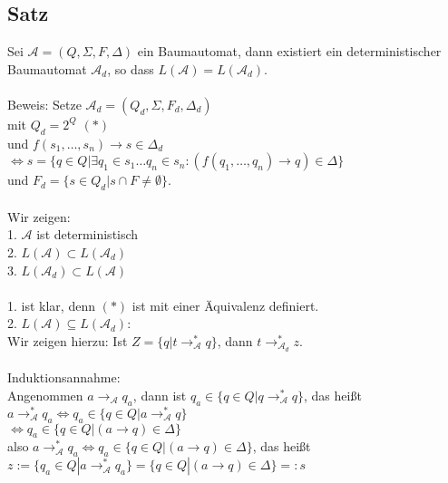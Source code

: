 \documentclass[titlepage]{article}
\begin{document}
\subsection{Satz}

Sei $\mathcal{A} = (Q, \Sigma, F, \Delta)$ ein Baumautomat, dann existiert ein deterministischer Baumautomat $\mathcal{A}_d$, 
so dass $L(\mathcal{A}) = L(\mathcal{A}_d)$.\\ \\

Beweis: Setze $\mathcal{A}_d = (Q_d, \Sigma, F_d, \Delta_d)$ \\
mit $Q_d = 2^Q$ $(\ast)$\\
und $f(s_1, \dots, s_n) \rightarrow s \in \Delta_d$\\
$\Leftrightarrow s = \{ q \in Q | \exists q_1 \in s_1 \dots q_n \in s_n: (f(q_1, \dots, q_n) \rightarrow q) \in \Delta\}$ \\
und $F_d = \{ s \in Q_d | s \cap F \neq \emptyset\}$.\\ \\
Wir zeigen:\\
1. $\mathcal{A}$ ist deterministisch \\
2. $L(\mathcal{A}) \subset L(\mathcal{A}_d)$ \\
3. $L(\mathcal{A}_d) \subset L(\mathcal{A})$ \\ \\

1. ist klar, denn $(\ast)$ ist mit einer \"Aquivalenz definiert.\\
2. \glqq$L(\mathcal{A}) \subseteq L(\mathcal{A}_d)$\grqq:\\

Wir zeigen hierzu: Ist $Z = \{ q | t \rightarrow ^\ast_\mathcal{A} q\}$, dann $ t \rightarrow ^\ast_{\mathcal{A}_d} z$.\\ \\

Induktionsannahme:\\
Angenommen $a \rightarrow _\mathcal{A} q_a$, dann ist $q_a \in \{ q \in Q | q \rightarrow ^\ast_\mathcal{A} q\}$, das hei\ss t\\
$a \rightarrow ^\ast_\mathcal{A} q_a \Leftrightarrow q_a \in \{ q \in Q | a \rightarrow ^\ast_\mathcal{A} q \}$\\
$\Leftrightarrow q_a \in \{ q \in Q | (a \rightarrow q) \in \Delta \}$\\
also $a \rightarrow ^\ast_\mathcal{A} q_a \Leftrightarrow q_a \in \{ q \in Q | (a \rightarrow q) \in \Delta \}$, das hei\ss t\\
$z := \{ q_a \in Q | a \rightarrow ^\ast_\mathcal{A} q_a \} = \{ q \in Q | (a \rightarrow q) \in \Delta \} =: s$\\
\end{document}

